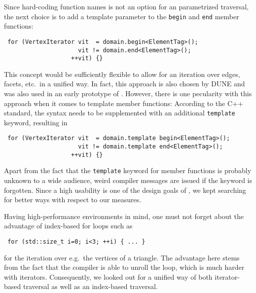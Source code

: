  Since hard-coding function names is not an option for an parametrized traversal,
 the next choice is to add a template parameter to the \lstinline|begin| and \lstinline|end| member functions:
 \begin{lstlisting}
 for (VertexIterator vit  = domain.begin<ElementTag>();
                     vit != domain.end<ElementTag>();
                   ++vit) {}
 \end{lstlisting}
 This concept would be sufficiently flexible to allow for an iteration over edges, facets, etc.~in a unified way.
 In fact, this approach is also chosen by DUNE \cite{DUNE} and was also used in an early prototype of {\ViennaGrid}.
 However, there is one pecularity with this approach when it comes to template member functions: According to the C++ standard, the syntax needs to be supplemented with an additional \lstinline|template| keyword, resulting in
 \begin{lstlisting}
 for (VertexIterator vit  = domain.template begin<ElementTag>();
                     vit != domain.template end<ElementTag>();
                   ++vit) {}
 \end{lstlisting}
 Apart from the fact that the \lstinline|template| keyword for member functions is probably unknown to a wide audience, 
 weird compiler messages are issued if the keyword is forgotten. Since a high usability is one of the design goals of {\ViennaGrid},
 we kept searching for better ways with respect to our measures.

 Having high-performance environments in mind, one must not forget about the advantage of index-based for loops such as 
 \begin{lstlisting}
 for (std::size_t i=0; i<3; ++i) { ... }
 \end{lstlisting}
 for the iteration over e.g.~the vertices of a triangle.
 The advantage here stems from the fact that the compiler is able to unroll the loop, which is much harder with iterators.
 Consequently, we looked out for a unified way of both iterator-based traversal as well as an index-based traversal.

